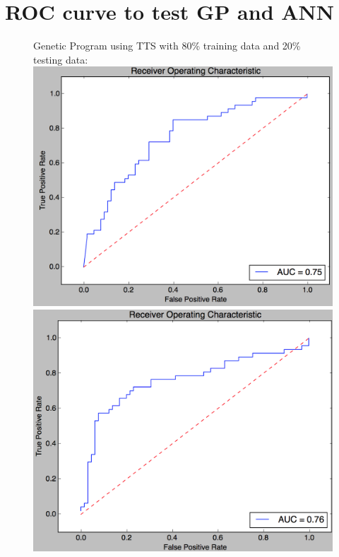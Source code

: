 \documentclass[11pt]{article}
\begin{document}
\section{ROC curve to test GP and ANN}
\begin{figure}[h]
\centering
Genetic Program using TTS with 80\% training data and 20\% testing data:
\includegraphics[scale = .40]{gp1}
\includegraphics[scale = .40]{gp2}
\end{figure}
\end{document}
